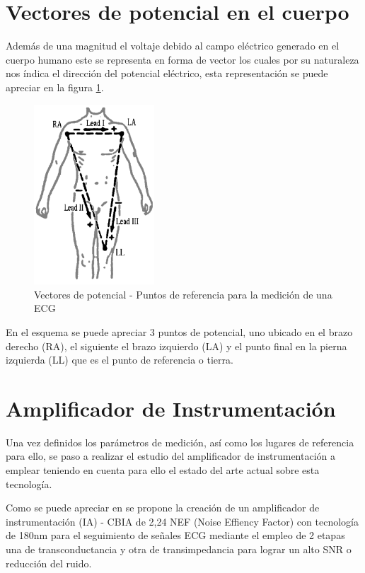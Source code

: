 \documentclass[conference]{IEEEtran}
\begin{document}
	\section{Vectores de potencial en el cuerpo}
	
	Además de una magnitud el voltaje debido al campo eléctrico generado en el cuerpo humano este se representa en forma de vector los cuales por su naturaleza nos índica el dirección del potencial eléctrico, esta representación se puede apreciar en la figura \ref{fig:vectores-potencial}.
	
	\begin{figure}[h]
		\centering
		\includegraphics[width=0.4\textwidth]{media/vectores-potencial}
		\caption{Vectores de potencial - Puntos de referencia para la medición de una ECG}
		\label{fig:vectores-potencial}
	\end{figure}
	
	En el esquema se puede apreciar 3 puntos de potencial, uno ubicado en el brazo derecho (RA), el siguiente el brazo izquierdo (LA) y el punto final en la pierna izquierda (LL) que es el punto de referencia o tierra.
	
	\section{Amplificador de Instrumentación}
	
	Una vez definidos los parámetros de medición, así como los lugares de referencia para ello, se paso a realizar el estudio del amplificador de instrumentación a emplear teniendo en cuenta para ello el estado del arte actual sobre esta tecnología.
	
	Como se puede apreciar en \cite{9455865} se propone la creación de un amplificador de instrumentación (IA) - CBIA de 2,24 NEF (Noise Effiency Factor) con tecnología de 180nm para el seguimiento de señales ECG mediante el empleo de 2 etapas una de transconductancia y otra de transimpedancia para lograr un alto SNR o reducción del ruido.
	
\end{document}
